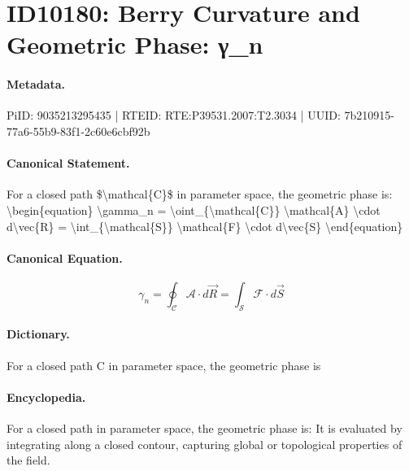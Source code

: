 \section*{ID10180: Berry Curvature and Geometric Phase: γ\_n}
\paragraph{Metadata.}
PiID: 9035213295435 | RTEID: RTE:P39531.2007:T2.3034 | UUID: 7b210915-77a6-55b9-83f1-2c60e6cbf92b

\paragraph{Canonical Statement.}
For a closed path \$\textbackslash{}mathcal\{C\}\$ in parameter space, the geometric phase is: \textbackslash{}begin\{equation\} \textbackslash{}gamma\_n = \textbackslash{}oint\_\{\textbackslash{}mathcal\{C\}\} \textbackslash{}mathcal\{A\} \textbackslash{}cdot d\textbackslash{}vec\{R\} = \textbackslash{}int\_\{\textbackslash{}mathcal\{S\}\} \textbackslash{}mathcal\{F\} \textbackslash{}cdot d\textbackslash{}vec\{S\} \textbackslash{}end\{equation\}

\paragraph{Canonical Equation.}
\[
\gamma_n = \oint_{\mathcal{C}} \mathcal{A} \cdot d\vec{R} = \int_{\mathcal{S}} \mathcal{F} \cdot d\vec{S}
\]

\paragraph{Dictionary.}
For a closed path C in parameter space, the geometric phase is

\paragraph{Encyclopedia.}
For a closed path in parameter space, the geometric phase is: It is evaluated by integrating along a closed contour, capturing global or topological properties of the field.
